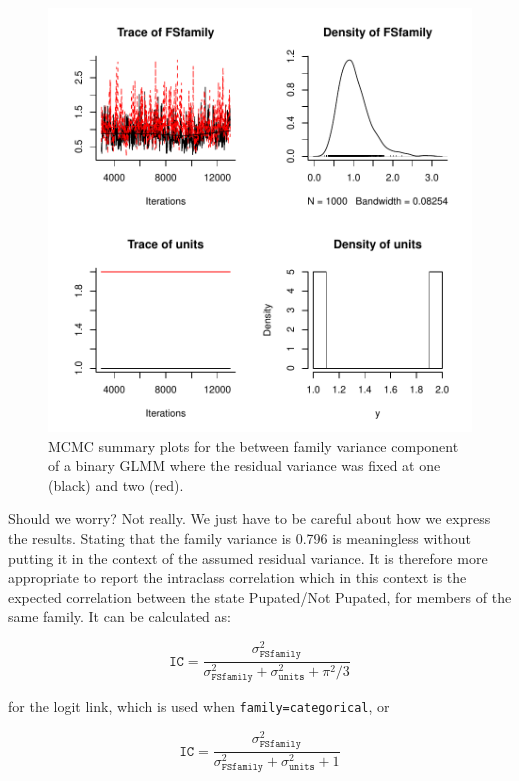 \documentclass{article}
\begin{document}
\begin{figure}[!h]
\begin{center}
\includegraphics{Lecture2-068}
\end{center}
\caption{MCMC summary plots for the between family variance component of a binary GLMM where the residual variance was fixed at one (black) and two (red).}
\label{Bin2-fig}
\end{figure}

Should we worry? Not really. We just have to be careful about how we express the results. Stating that the family variance is 0.796 is meaningless without putting it in the context of the assumed residual variance. It is therefore more appropriate to report the intraclass correlation which in this context is the expected correlation between the state Pupated/Not Pupated, for members of the same family. It can be calculated as:

\begin{equation}
\texttt{IC} =  \frac{\sigma^{2}_{\texttt{FSfamily}}}{\sigma^{2}_{\texttt{FSfamily}}+\sigma^{2}_{\texttt{units}}+\pi^{2}/3} 
\end{equation} 

for the logit link, which is used when \texttt{family=categorical}, or 

\begin{equation}
\texttt{IC} =  \frac{\sigma^{2}_{\texttt{FSfamily}}}{\sigma^{2}_{\texttt{FSfamily}}+\sigma^{2}_{\texttt{units}}+1} 
\end{equation} 
\end{document}
